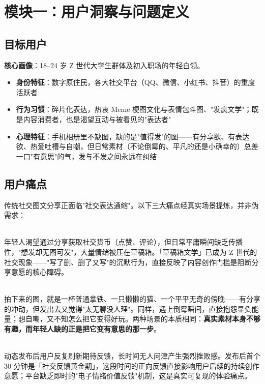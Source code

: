 \documentclass[10pt, a4paper]{article}
\newcommand{\kw}[1]{\textbf{#1}}
\begin{document}
\newpage
\tableofcontents
\newpage

\section{模块一：用户洞察与问题定义}

\subsection{目标用户}

\kw{核心画像}：18--24 岁 Z 世代大学生群体及初入职场的年轻白领。

\begin{itemize}[leftmargin=2em, itemsep=0.2em, topsep=3pt]
  \item \kw{身份特征}：数字原住民，各大社交平台（QQ、微信、小红书、抖音）的重度活跃者
  \item \kw{行为习惯}：碎片化表达，热衷 Meme 梗图文化与表情包斗图、"发疯文学"；既是内容消费者，也是渴望互动与被看见的"表达者"
  \item \kw{心理特征}：手机相册里不缺图，缺的是"值得发"的图——有分享欲、有表达欲、热爱吐槽与自嘲，但日常素材（不论倒霉的、平凡的还是小确幸的）总差一口"有意思"的气，发与不发之间永远在纠结
\end{itemize}

\subsection{用户痛点}

传统社交图文分享正面临"社交表达通缩"。以下三大痛点经真实场景提炼，并非伪需求：

\vspace{3pt}
\begin{description}[leftmargin=0em, style=nextline, itemsep=0.5em, topsep=2pt]
  \item[\kw{痛点一：精装朋友圈带来的分享焦虑（素材门槛高）}]\mbox{}\\
    年轻人渴望通过分享获取社交货币（点赞、评论），但日常平庸瞬间缺乏传播性，"想发却无图可发"，大量情绪被压在草稿箱。「草稿箱文学」已成为 Z 世代的社交现象——"写了删、删了又写"的沉默行为，直接反映了内容创作门槛是阻断分享意愿的核心障碍。

  \item[\kw{痛点二：表达欲与内容趣味性之间的落差（素材无聊但想发）}]\mbox{}\\
    拍下来的图，就是一杯普通拿铁、一只懒懒的猫、一个平平无奇的傍晚——有分享的冲动，但发出去又觉得"太无聊没人理"。同样，遇上倒霉瞬间，直接抱怨显负能量；想自嘲，又不知怎么把它变得好玩。两种场景的本质相同：\textbf{真实素材本身不够有趣，而年轻人缺的正是把它变有意思的那一步}。

  \item[\kw{痛点三：发布后的社交空窗期折磨（反馈缺位）}]\mbox{}\\
    动态发布后用户反复刷新期待反馈，长时间无人问津产生强烈挫败感。发布后首个 30 分钟是「社交反馈黄金期」，这段时间的正向反馈直接影响用户后续的持续创作意愿；平台缺乏即时的"电子情绪价值反馈"机制，这是真实可复现的体验痛点。
\end{description}
\end{document}
